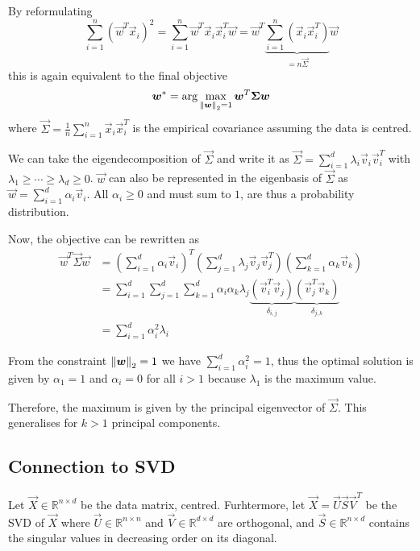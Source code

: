 By reformulating
\begin{equation*}
    \sum_{i=1}^n{(\vec{w}^T \vec{x}_i)^2}
    = \sum_{i=1}^n{\vec{w}^T \vec{x}_i \vec{x}_i^T \vec{w}}
    = \vec{w}^T \underbrace{\sum_{i=1}^n{(\vec{x}_i \vec{x}_i^T)}}_{= n \vec{\Sigma}} \vec{w}
\end{equation*}
this is again equivalent to the final objective
\begin{equation*}
    \boldsymbol{w}^* = \arg\max_{\left\lVert\boldsymbol{w}\right\rVert_2 = 1}{
        \boldsymbol{w}^T \boldsymbol{\Sigma} \boldsymbol{w}
    }
\end{equation*}
where $\vec{\Sigma} = \frac{1}{n} \sum_{i=1}^n{\vec{x}_i \vec{x}_i^T}$ is the empirical covariance assuming the
data is centred.

We can take the eigendecomposition of $\vec{\Sigma}$ and
write it as
$\vec{\Sigma} = \sum_{i=1}^d{\lambda_i \vec{v}_i \vec{v}_i^T}$
with $\lambda_1 \geq \dotsb \geq \lambda_d \geq 0$.
$\vec{w}$ can also be represented in the eigenbasis
of $\vec{\Sigma}$ as
$\vec{w} = \sum_{i=1}^d{\alpha_i \vec{v}_i}$.
All $\alpha_i \geq 0$ and must sum to $1$,
are thus a probability distribution.

Now, the objective can be rewritten as
\begin{align*}
    \vec{w}^T \vec{\Sigma} \vec{w}
    &= \left(
        \sum_{i=1}^d{\alpha_i \vec{v}_i}
    \right)^T \left(
        \sum_{j=1}^d{\lambda_j \vec{v}_j \vec{v}_j^T}
    \right) \left(
        \sum_{k=1}^d{\alpha_k \vec{v}_k}
    \right) \\
    &= \sum_{i=1}^d{\sum_{j=1}^d{\sum_{k=1}^d{
        \alpha_i \alpha_k \lambda_j
        \underbrace{(\vec{v}_i^T \vec{v}_j)}_{\delta_{i,j}}
        \underbrace{(\vec{v}_j^T \vec{v}_k)}_{\delta_{j,k}}
    }}} \\
    &= \sum_{i=1}^d{\alpha_i^2 \lambda_i}
\end{align*}

From the constraint $\left\lVert\boldsymbol{w}\right\rVert_2 = 1$ we have
$\sum_{i=1}^d{\alpha_i^2} = 1$,
thus the optimal solution is given by
$\alpha_1 = 1$ and $\alpha_i = 0$ for all $i > 1$
because $\lambda_1$ is the maximum value.

Therefore, the maximum is given by the principal eigenvector
of $\vec{\Sigma}$.
This generalises for $k > 1$ principal components.


\subsection{Connection to SVD}
Let $\vec{X} \in \mathbb{R}^{n \times d}$ be the data matrix,
centred.
Furhtermore, let $\vec{X} = \vec{U} \vec{S} \vec{V}^T$ be
the SVD of $\vec{X}$ where $\vec{U} \in \mathbb{R}^{n \times n}$
and $\vec{V} \in \mathbb{R}^{d \times d}$ are orthogonal,
and $\vec{S} \in \mathbb{R}^{n \times d}$ contains the singular
values in decreasing order on its diagonal.

